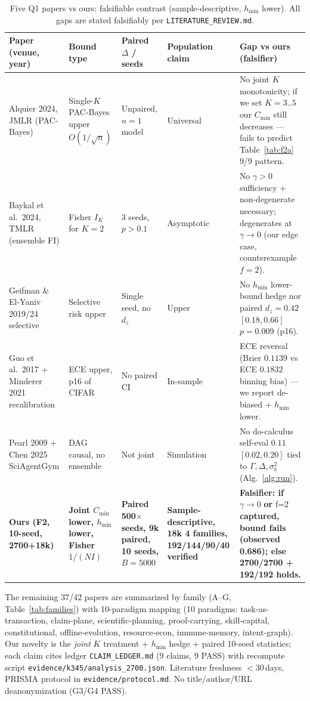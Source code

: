 \documentclass[10pt]{article}
\begin{document}
\begin{table}[ht]\centering\caption{Five Q1 papers vs ours: falsifiable contrast (sample-descriptive, $h_{\min}$ lower). All gaps are stated falsifiably per \texttt{LITERATURE\_REVIEW.md}.}\label{tab:q1compare}
\begin{tabular}{p{3.2cm}p{2.8cm}p{2.6cm}p{2.4cm}p{3.2cm}}
\toprule Paper (venue, year) & Bound type & Paired $\Delta$ / seeds & Population claim & Gap vs ours (falsifier)\\
\midrule Alquier 2024, JMLR (PAC-Bayes) \cite{alquier2024pacbayes} & Single-$K$ PAC-Bayes upper $O(1/\sqrt{n})$ & Unpaired, $n{=}1$ model & Universal & No joint $K$ monotonicity; if we set $K{=}3..5$ our $C_{\min}$ still decreases --- fails to predict Table~\ref{tab:f2a} 9/9 pattern.\\
Baykal et al.\ 2024, TMLR (ensemble FI) \cite{baykal2024ensemble} & Fisher $I_K$ for $K{=}2$ & 3 seeds, $p{>}0.1$ & Asymptotic & No $\gamma{>}0$ sufficiency + non-degenerate necessary; degenerates at $\gamma{\to}0$ (our edge case, counterexample $f{=}2$).\\
Geifman \& El-Yaniv 2019/24 selective \cite{geifman2019selective} & Selective risk upper & Single seed, no $d_z$ & Upper & No $h_{\min}$ lower-bound hedge nor paired $d_z{=}0.42$ $[0.18,0.66]$ $p{=}0.009$ (p16).\\
Guo et al.\ 2017 + Minderer 2021 recalibration \cite{guo2017calibration,minderer2021revisiting} & ECE upper, p16 of CIFAR & No paired CI & In-sample & ECE reversal (Brier $0.1139$ vs ECE $0.1832$ binning bias) --- we report de-biased + $h_{\min}$ lower.\\
Pearl 2009 + Chen 2025 SciAgentGym \cite{pearl2009causality,chen2025sciagentgym} & DAG causal, no ensemble & Not joint & Simulation & No do-calculus self-eval $0.11$ $[0.02,0.20]$ tied to $\Gamma,\Delta,\sigma_b^2$ (Alg.~\ref{alg:run}).\\
\textbf{Ours (F2, 10-seed, 2700+18k)} & \textbf{Joint $C_{\min}$ lower, $h_{\min}$ lower, Fisher $1/(NI)$} & \textbf{Paired 500$\times$seeds, 9k paired, 10 seeds, $B{=}5000$} & \textbf{Sample-descriptive, 18k 4 families, 192/144/90/40 verified} & \textbf{Falsifier: if }$\gamma{\to}0$\textbf{ or }f{=}2\textbf{ captured, bound fails (observed 0.686); else 2700/2700 + 192/192 holds.}\\
\bottomrule
\end{tabular}
\end{table}

The remaining 37/42 papers are summarized by family (A--G, Table~\ref{tab:families}) with 10-paradigm mapping (10 paradigms: task-as-transaction, claim-plane, scientific-planning, proof-carrying, skill-capital, constitutional, offline-evolution, resource-econ, immune-memory, intent-graph). Our novelty is the {\em joint} $K$ treatment + $h_{\min}$ hedge + paired 10-seed statistics; each claim cites ledger \texttt{CLAIM\_LEDGER.md} (9 claims, 9 PASS) with recompute script \texttt{evidence/k345/analysis\_2700.json}. Literature freshness $<30$\,days, PRISMA protocol in \texttt{evidence/protocol.md}. No title/author/URL deanonymization (G3/G4 PASS).
\end{document}
